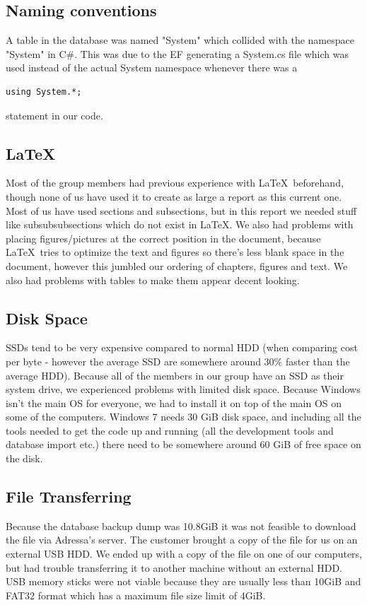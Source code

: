 \subsection{Naming conventions}
A table in the database was named "System" which collided with the namespace "System" in C\#. This was due to the EF generating a System.cs file which was used instead of the actual System namespace whenever there was a 
\begin{lstlisting}
using System.*;
\end{lstlisting}
statement in our code.

\subsection{\LaTeX}
Most of the group members had previous experience with \LaTeX \ beforehand, though none of us have used it to create as large a report as this current one. Most of us have used sections and subsections, but in this report we needed stuff like subsubsubsections which do not exist in \LaTeX . We also had problems with placing figures/pictures at the correct position in the document, because \LaTeX \ tries to optimize the text and figures so there's less blank space in the document, however this jumbled our ordering of chapters, figures and text. We also had problems with tables to make them appear decent looking.


\subsection{Disk Space}
SSDs tend to be very expensive compared to normal HDD (when comparing cost per byte - however the average SSD are somewhere around 30\% faster than the average HDD). 
Because all of the members in our group have an SSD as their system drive, we experienced problems with limited disk space. Because Windows isn't the main OS for everyone, we had to install it on top of the main OS on some of the computers. Windows 7 needs 30 GiB disk space, and including all the tools needed to get the code up and running (all the development tools and database import etc.) there need to be somewhere around 60 GiB of free space on the disk.

\subsection{File Transferring}
Because the database backup dump was 10.8GiB it was not feasible to download the file via Adressa's server. The customer brought a copy of the file for us on an external USB HDD. We ended up with a copy of the file on one of our computers, but had trouble transferring it to another machine without an external HDD. USB memory sticks were not viable because they are usually less than 10GiB and FAT32 format which has a maximum file size limit of 4GiB. 

